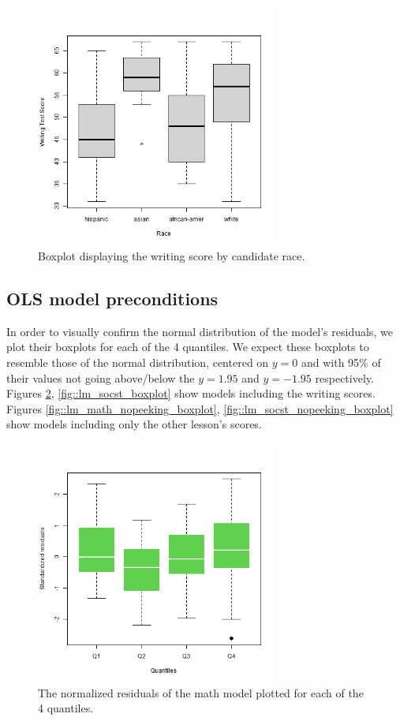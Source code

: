 \documentclass[10pt, a4paper]{article}
\begin{document}
	\begin{figure}[h]
		\includegraphics[width=8cm]{write_race_boxplot.png}
		\centering
		\caption{Boxplot displaying the writing score by candidate race.}
		\label{fig::write_race_boxplot}
	\end{figure}
	
	
	\subsection{OLS model preconditions}
	
	In order to visually confirm the normal distribution of the model's residuals, we plot their boxplots for each of the 4 quantiles. We expect these boxplots to resemble those of the normal distribution, centered on $y=0$ and with 95\% of their values not going above/below the $y=1.95$ and $y=-1.95$ respectively. Figures \ref{fig::lm_math_boxplot}, \ref{fig::lm_socst_boxplot} show models including the writing scores. Figures \ref{fig::lm_math_nopeeking_boxplot}, \ref{fig::lm_socst_nopeeking_boxplot} show models including only the other lesson's scores.
	
	\begin{figure}
		\includegraphics[width=8cm]{lm_math_residual_boxplot.png}
		\centering
		\caption{The normalized residuals of the math model plotted for each of the 4 quantiles.}
		\label{fig::lm_math_boxplot}
	\end{figure}
\end{document}
